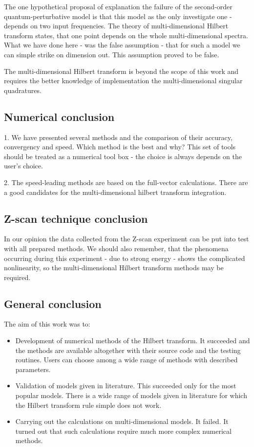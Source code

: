 \documentclass[12pt,twoside,a4paper]{article}
\numberwithin{equation}{subsection}
\numberwithin{figure}{subsection}
\begin{document}
The one hypothetical proposal of explanation the failure of the second-order quantum-perturbative model is that this model as the
only investigate one - depends on two input frequencies. The theory of multi-dimensional Hilbert transform states, that one point
depends on the whole multi-dimensional spectra. What we have done here - was the false assumption - that for such a model we can
simple strike on dimension out. This assumption proved to be false. 

The multi-dimensional Hilbert transform is beyond the scope of this work and requires the better knowledge of implementation the
multi-dimensional singular quadratures.


\subsection{Numerical conclusion} \label{chap:conclusion_numerical}


1. We have presented several methods and the comparison of their accuracy, convergency and speed. Which method is the best and why?
This set of tools should be treated as a numerical tool box - the choice is always depends on the user's choice.


2. The speed-leading methods are based on the full-vector calculations. There are a good candidates for the multi-dimensional
hilbert transform integration.

\subsection{Z-scan technique conclusion} \label{chap:conclusion_zscan}

In our opinion the data collected from the Z-scan experiment can be put into test with all prepared methods. We should also
remember, that the phenomena occurring during this experiment  - due to strong energy - shows the complicated nonlinearity, so the
multi-dimensional Hilbert transform methods may be required. 

\subsection{General conclusion} \label{chap:conclusion_general}

The aim of this work was to:

\begin{itemize} 
	\item Development of numerical methods of the Hilbert transform. It succeeded and the methods are available altogether with
	their source code and the testing routines. Users can choose among a wide range of methods with described parameters.
	\item Validation of models given in literature. This succeeded only for the most popular models. There is a wide range of models
	given in literature for which the Hilbert transform rule simple does not work.
	\item Carrying out the calculations on multi-dimensional models. It failed. It turned out that such calculations require much more
	complex numerical methods.
\end{itemize}
\end{document}
